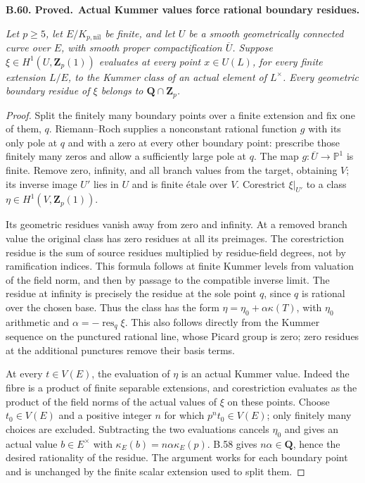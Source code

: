 \documentclass[11pt,a4paper]{article}
\newcommand{\Z}{\mathbf Z}
\newcommand{\Q}{\mathbf Q}
\newenvironment{claim}[3]{\par\medskip\noindent\hypertarget{#1}{\textbf{#1. #2.}}\ \textbf{#3.}\par\nopagebreak\smallskip\begingroup\itshape}{\endgroup\par\smallskip}
\begin{document}
\begin{claim}{B.60}{Proved}{Actual Kummer values force rational boundary residues}
Let \(p\geq5\), let \(E/K_{p,\mathrm{nil}}\) be finite,
and let \(U\) be a smooth geometrically connected curve over
\(E\), with smooth proper compactification \(\overline U\).
Suppose \(\xi\in H^1(U,\Z_p(1))\) evaluates at every point
\(x\in U(L)\), for every finite extension \(L/E\), to the
Kummer class of an actual element of \(L^\times\).
Every geometric boundary residue of \(\xi\) belongs to
\(\Q\cap\Z_p\).
\end{claim}
\begin{proof}
Split the finitely many boundary points over a finite extension
and fix one of them, \(q\). Riemann--Roch supplies a nonconstant
rational function \(g\) with its only pole at \(q\) and with a
zero at every other boundary point: prescribe those finitely
many zeros and allow a sufficiently large pole at \(q\).
The map \(g:\overline U\to\mathbb P^1\) is finite.
Remove zero, infinity, and all branch values from the target,
obtaining \(V\); its inverse image \(U'\) lies in \(U\)
and is finite étale over \(V\). Corestrict \(\xi|_{U'}\)
to a class \(\eta\in H^1(V,\Z_p(1))\).

Its geometric residues vanish away from zero and infinity.
At a removed branch value the original class has zero
residues at all its preimages. The corestriction residue
is the sum of source residues multiplied by residue-field
degrees, not by ramification indices. This formula follows
at finite Kummer levels from valuation of the field norm,
and then by passage to the compatible inverse limit.
The residue at infinity is precisely the residue at the
sole point \(q\), since \(q\) is rational over the chosen
base. Thus the class has the form
\(\eta=\eta_0+\alpha\kappa(T)\), with \(\eta_0\) arithmetic
and \(\alpha=-\operatorname{res}_q\xi\). This also follows
directly from the Kummer sequence on the punctured rational
line, whose Picard group is zero; zero residues at the
additional punctures remove their basis terms.

At every \(t\in V(E)\), the evaluation of \(\eta\) is
an actual Kummer value. Indeed the fibre is a product of
finite separable extensions, and corestriction evaluates
as the product of the field norms of the actual values
of \(\xi\) on these points. Choose \(t_0\in V(E)\) and
a positive integer \(n\) for which \(p^nt_0\in V(E)\);
only finitely many choices are excluded. Subtracting the
two evaluations cancels \(\eta_0\) and gives an actual
value \(b\in E^\times\) with
\(\kappa_E(b)=n\alpha\kappa_E(p)\).
B.58 gives \(n\alpha\in\Q\), hence the desired
rationality of the residue. The argument works for each
boundary point and is unchanged by the finite scalar
extension used to split them.
\end{proof}
\end{document}
